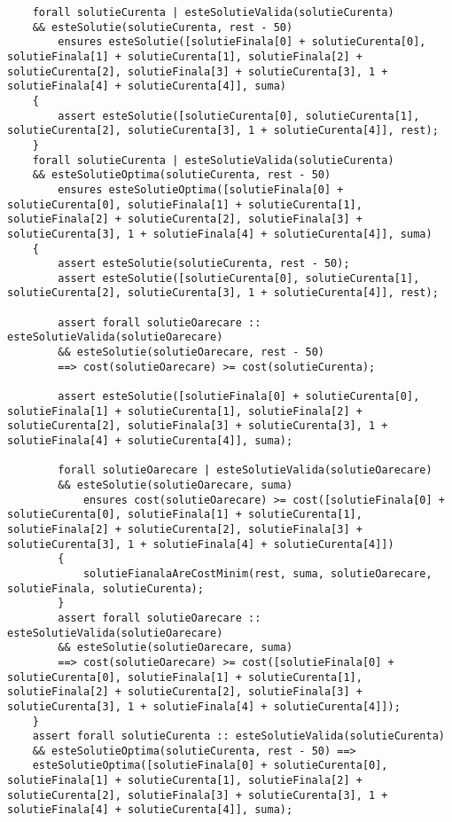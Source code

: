 \begin{enumerate}
\begin{lstlisting}
	forall solutieCurenta | esteSolutieValida(solutieCurenta) 
	&& esteSolutie(solutieCurenta, rest - 50) 
		ensures esteSolutie([solutieFinala[0] + solutieCurenta[0], solutieFinala[1] + solutieCurenta[1], solutieFinala[2] + solutieCurenta[2], solutieFinala[3] + solutieCurenta[3], 1 + solutieFinala[4] + solutieCurenta[4]], suma)
	{
		assert esteSolutie([solutieCurenta[0], solutieCurenta[1], solutieCurenta[2], solutieCurenta[3], 1 + solutieCurenta[4]], rest);
	}
	forall solutieCurenta | esteSolutieValida(solutieCurenta) 
	&& esteSolutieOptima(solutieCurenta, rest - 50) 
		ensures esteSolutieOptima([solutieFinala[0] + solutieCurenta[0], solutieFinala[1] + solutieCurenta[1], solutieFinala[2] + solutieCurenta[2], solutieFinala[3] + solutieCurenta[3], 1 + solutieFinala[4] + solutieCurenta[4]], suma)
	{
		assert esteSolutie(solutieCurenta, rest - 50);
		assert esteSolutie([solutieCurenta[0], solutieCurenta[1], solutieCurenta[2], solutieCurenta[3], 1 + solutieCurenta[4]], rest);
		
		assert forall solutieOarecare :: esteSolutieValida(solutieOarecare)
		&& esteSolutie(solutieOarecare, rest - 50) 
		==> cost(solutieOarecare) >= cost(solutieCurenta);
		
		assert esteSolutie([solutieFinala[0] + solutieCurenta[0], solutieFinala[1] + solutieCurenta[1], solutieFinala[2] + solutieCurenta[2], solutieFinala[3] + solutieCurenta[3], 1 + solutieFinala[4] + solutieCurenta[4]], suma);
		
		forall solutieOarecare | esteSolutieValida(solutieOarecare)
		&& esteSolutie(solutieOarecare, suma)
			ensures cost(solutieOarecare) >= cost([solutieFinala[0] + solutieCurenta[0], solutieFinala[1] + solutieCurenta[1], solutieFinala[2] + solutieCurenta[2], solutieFinala[3] + solutieCurenta[3], 1 + solutieFinala[4] + solutieCurenta[4]])
		{
			solutieFianalaAreCostMinim(rest, suma, solutieOarecare, solutieFinala, solutieCurenta);
		}
		assert forall solutieOarecare :: esteSolutieValida(solutieOarecare)
		&& esteSolutie(solutieOarecare, suma) 
		==> cost(solutieOarecare) >= cost([solutieFinala[0] + solutieCurenta[0], solutieFinala[1] + solutieCurenta[1], solutieFinala[2] + solutieCurenta[2], solutieFinala[3] + solutieCurenta[3], 1 + solutieFinala[4] + solutieCurenta[4]]);
	}
	assert forall solutieCurenta :: esteSolutieValida(solutieCurenta)
	&& esteSolutieOptima(solutieCurenta, rest - 50) ==> 
	esteSolutieOptima([solutieFinala[0] + solutieCurenta[0], solutieFinala[1] + solutieCurenta[1], solutieFinala[2] + solutieCurenta[2], solutieFinala[3] + solutieCurenta[3], 1 + solutieFinala[4] + solutieCurenta[4]], suma);
	

\end{lstlisting}
\end{enumerate}
